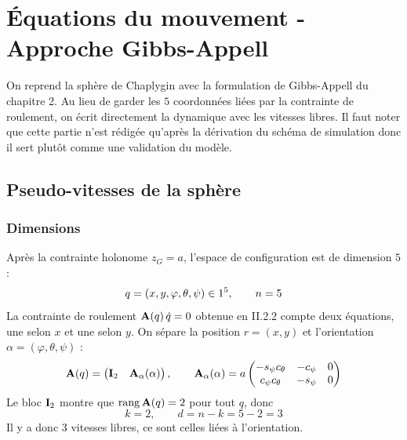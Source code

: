 
\section{Équations du mouvement - Approche Gibbs-Appell}

On reprend la sphère de Chaplygin avec la formulation de Gibbs-Appell
du chapitre 2. Au lieu de garder les $5$ coordonnées liées par la
contrainte de roulement, on écrit directement la dynamique avec les
vitesses libres. Il faut noter que cette partie n'est rédigée qu'après la dérivation
du schéma de simulation donc il sert plutôt comme une validation du modèle.

\subsection{Pseudo-vitesses de la sphère}

\subsubsection{Dimensions}

Après la contrainte holonome $z_G = a$, l'espace de configuration est
de dimension $5$ :
\[
    q = (x, y, \varphi, \theta, \psi)\in1^5,
    \qquad n = 5
\]
La contrainte de roulement $\mathbf{A}(q)\,\dot q = 0$ obtenue en II.2.2
compte deux équations, une selon $x$ et une selon $y$. On sépare la
position $r = (x,y)$ et l'orientation $\alpha = (\varphi,\theta,\psi)$ :
\[
    \mathbf{A}(q) = \begin{pmatrix} \mathbf{I}_2 & \mathbf{A}_\alpha(\alpha)
    \end{pmatrix},
    \qquad
    \mathbf{A}_\alpha(\alpha) = a\begin{pmatrix}
        -s_\psi c_\theta & -c_\psi & 0\\
        c_\psi c_\theta & -s_\psi & 0
    \end{pmatrix}
\]
Le bloc $\mathbf{I}_2$ montre que $\operatorname{rang}\mathbf{A}(q) = 2$ pour tout $q$, donc
\[
    k = 2,
    \qquad
    d = n - k = 5 - 2 = 3
\]
Il y a donc $3$ vitesses libres, ce sont celles liées à l'orientation.

